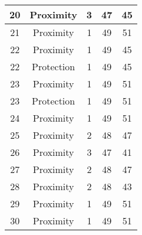 \documentclass[results.tex]{subfiles}
\begin{document}
\begin{center}
\begin{tabular}{| c || c | c | c | c |}
            \hline
            20                      & Proximity                    & 3                      & 47                      & 45                   \\
            \hline
            21                      & Proximity                    & 1                      & 49                      & 51                   \\
            \hline
            22                      & Proximity                    & 1                      & 49                      & 45                   \\
            \hline
            22                      & Protection                   & 1                      & 49                      & 45                   \\
            \hline
            23                      & Proximity                    & 1                      & 49                      & 51                   \\
            \hline
            23                      & Protection                   & 1                      & 49                      & 51                   \\
            \hline
            24                      & Proximity                    & 1                      & 49                      & 51                   \\
            \hline
            25                      & Proximity                    & 2                      & 48                      & 47                   \\
            \hline
            26                      & Proximity                    & 3                      & 47                      & 41                   \\
            \hline
            27                      & Proximity                    & 2                      & 48                      & 47                   \\
            \hline
            28                      & Proximity                    & 2                      & 48                      & 43                   \\
            \hline
            29                      & Proximity                    & 1                      & 49                      & 51                   \\
            \hline
            30                      & Proximity                    & 1                      & 49                      & 51                   \\

\end{tabular}
\end{center}
\end{document}
